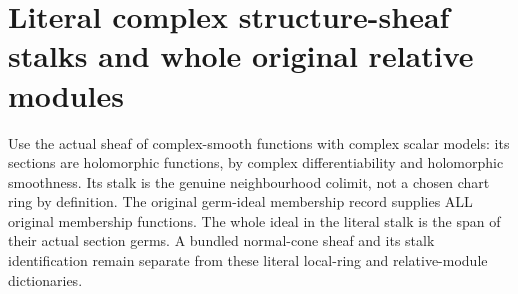 \section{Literal complex structure-sheaf stalks and whole original relative modules}

Use the actual sheaf of complex-smooth functions with complex scalar
models: its sections are holomorphic functions, by complex differentiability
and holomorphic smoothness. Its stalk is the genuine neighbourhood colimit,
not a chosen chart ring by definition. The original germ-ideal membership
record supplies ALL original membership functions. The whole ideal in the
literal stalk is the span of their actual section germs. A bundled
normal-cone sheaf and its stalk identification remain separate from these
literal local-ring and relative-module dictionaries.

